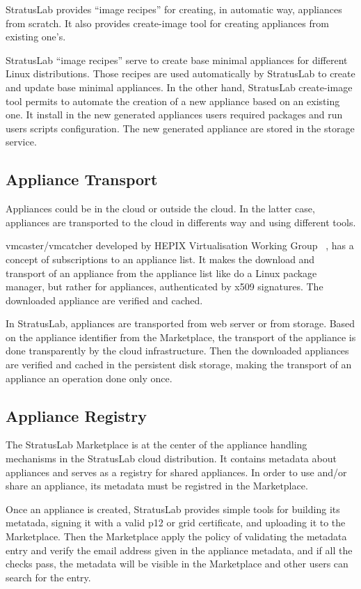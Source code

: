 StratusLab provides ``image recipes'' for creating, in automatic way, appliances from scratch. 
It also provides create-image tool for creating appliances from existing one's.

StratusLab ``image recipes'' serve to create base minimal appliances for different
Linux distributions. Those recipes are used automatically by StratusLab to create 
and update base minimal appliances. In the other hand, StratusLab create-image tool 
permits to automate the creation of a new appliance based on an existing one.
It install in the new generated appliances users required packages and run users 
scripts configuration.
The new generated appliance are stored in the storage service.

\subsection{Appliance Transport}

Appliances could be in the cloud or outside the cloud. In the latter case, 
appliances are transported to the cloud in differents way and using different tools.

vmcaster/vmcatcher developed by HEPIX Virtualisation Working
Group ~\cite{hepixbooktransfer}, has a concept of subscriptions to an 
appliance list. It makes the  download and transport of an appliance 
from the appliance list like do a Linux package manager, but rather for
appliances, authenticated by x509 signatures. The downloaded appliance are
verified and cached.

In StratusLab, appliances are transported from web
server or from storage. Based on the appliance identifier from the Marketplace,
the transport of the appliance is done transparently by the cloud infrastructure.
Then the downloaded appliances are verified and cached in the persistent disk storage,
making the transport of an appliance an operation done only once.

\subsection{Appliance Registry}
The StratusLab Marketplace is at the center of the appliance handling
mechanisms in the StratusLab cloud distribution. It contains metadata 
about appliances and serves as a registry for shared appliances. 
In order to use and/or share an appliance, its metadata must be registred 
in the Marketplace. 

Once an appliance is created, StratusLab provides simple tools for 
building its metatada, signing it with a valid p12 or grid
certificate, and uploading it to the Marketplace.  Then the Marketplace
apply the policy of validating the metadata entry and verify the 
email address given in the appliance metadata, and if all the checks pass, 
the metadata will be visible in the Marketplace and other users 
can search for the entry.

